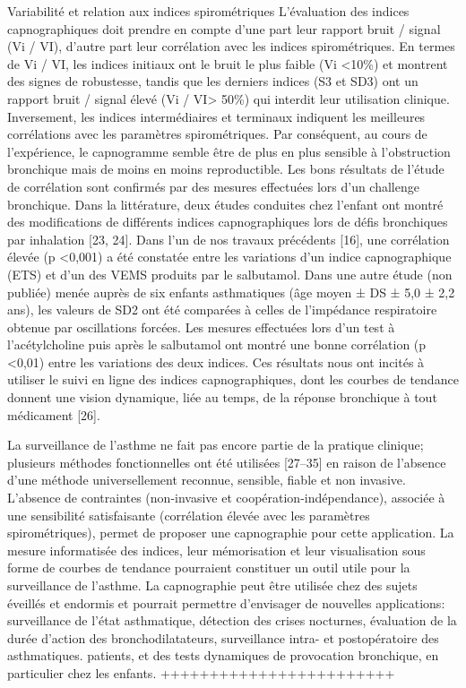 \documentclass[12pt,]{article}
\begin{document}
Variabilité et relation aux indices spirométriques L'évaluation des
indices capnographiques doit prendre en compte d'une part leur rapport
bruit / signal (Vi / VI), d'autre part leur corrélation avec les indices
spirométriques. En termes de Vi / VI, les indices initiaux ont le bruit
le plus faible (Vi \textless{}10\%) et montrent des signes de
robustesse, tandis que les derniers indices (S3 et SD3) ont un rapport
bruit / signal élevé (Vi / VI\textgreater{} 50\%) qui interdit leur
utilisation clinique. Inversement, les indices intermédiaires et
terminaux indiquent les meilleures corrélations avec les paramètres
spirométriques. Par conséquent, au cours de l'expérience, le capnogramme
semble être de plus en plus sensible à l'obstruction bronchique mais de
moins en moins reproductible. Les bons résultats de l'étude de
corrélation sont confirmés par des mesures effectuées lors d'un
challenge bronchique. Dans la littérature, deux études conduites chez
l'enfant ont montré des modifications de différents indices
capnographiques lors de défis bronchiques par inhalation {[}23, 24{]}.
Dans l'un de nos travaux précédents {[}16{]}, une corrélation élevée (p
\textless{}0,001) a été constatée entre les variations d'un indice
capnographique (ETS) et d'un des VEMS produits par le salbutamol. Dans
une autre étude (non publiée) menée auprès de six enfants asthmatiques
(âge moyen ± DS ± 5,0 ± 2,2 ans), les valeurs de SD2 ont été comparées à
celles de l'impédance respiratoire obtenue par oscillations forcées. Les
mesures effectuées lors d'un test à l'acétylcholine puis après le
salbutamol ont montré une bonne corrélation (p \textless{}0,01) entre
les variations des deux indices. Ces résultats nous ont incités à
utiliser le suivi en ligne des indices capnographiques, dont les courbes
de tendance donnent une vision dynamique, liée au temps, de la réponse
bronchique à tout médicament {[}26{]}.

La surveillance de l'asthme ne fait pas encore partie de la pratique
clinique; plusieurs méthodes fonctionnelles ont été utilisées
{[}27--35{]} en raison de l'absence d'une méthode universellement
reconnue, sensible, fiable et non invasive. L'absence de contraintes
(non-invasive et coopération-indépendance), associée à une sensibilité
satisfaisante (corrélation élevée avec les paramètres spirométriques),
permet de proposer une capnographie pour cette application. La mesure
informatisée des indices, leur mémorisation et leur visualisation sous
forme de courbes de tendance pourraient constituer un outil utile pour
la surveillance de l'asthme. La capnographie peut être utilisée chez des
sujets éveillés et endormis et pourrait permettre d'envisager de
nouvelles applications: surveillance de l'état asthmatique, détection
des crises nocturnes, évaluation de la durée d'action des
bronchodilatateurs, surveillance intra- et postopératoire des
asthmatiques. patients, et des tests dynamiques de provocation
bronchique, en particulier chez les enfants. ++++++++++++++++++++++++
\end{document}
